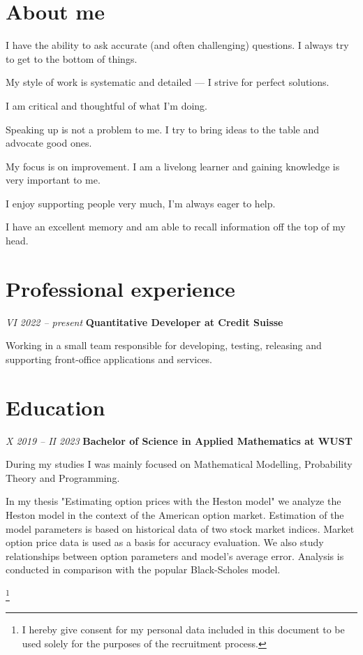 \documentclass[a4paper,12pt]{article}
\newlength{\rightwidth}
\begin{document}
\begin{minipage}[t][][t]{\rightwidth}
  \section*{About me}
  I have the ability to ask accurate (and often challenging) questions.
  I always try to get to the bottom of things.

  My style of work is systematic and detailed --- I strive for perfect solutions.

  I am critical and thoughtful of what I'm doing.

  Speaking up is not a problem to me.
  I try to bring ideas to the table and advocate good ones.

  My focus is on improvement.
  I am a livelong learner and gaining knowledge is very important to me.

  I enjoy supporting people very much, I'm always eager to help.

  I have an excellent memory and am able to recall information off the top of my head.

  \section*{Professional experience}

  \textsl{VI 2022 -- present}\newline
  \textbf{Quantitative Developer at Credit Suisse}
  \vspace{2mm}

  Working in a small team responsible for developing, testing, releasing and supporting front-office applications and services.

  \section*{Education}
  \textsl{X 2019 -- II 2023}\newline
  \textbf{Bachelor of Science in Applied Mathematics at WUST}
  \vspace{2mm}

  During my studies I was mainly focused on Mathematical Modelling, Probability Theory and Programming.

  In my thesis "Estimating option prices with the Heston model" we analyze the Heston model in the context of the American option market.
  Estimation of the model parameters is based on historical data of two stock market indices.
  Market option price data is used as a basis for accuracy evaluation.
  We also study relationships between option parameters and model's average error.
  Analysis is conducted in comparison with the popular Black-Scholes model.
\end{minipage}

\let\thefootnote\relax
\let\footnoterule\relax
\footnote{
  I hereby give consent for my personal data included in this document
  to be used solely for the purposes of the recruitment process.
}
\end{document}
